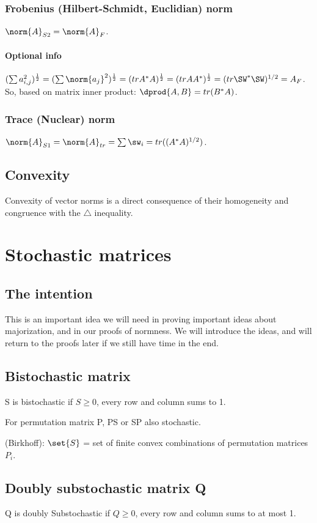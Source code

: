 \documentclass[10pt]{amsart}
\begin{document}
\subsubsection{Frobenius (Hilbert-Schmidt, Euclidian) norm}
$\norm{A}_{S2} = \norm{A}_{F}$.

\paragraph*{Optional info}
$(\sum a_{i,j}^{2})^{\frac{1}{2}} = (\sum \norm{a_{j}}^{2})^{\frac{1}{2}} = (tr A^{*}A)^{\frac{1}{2}} = (tr AA^{*})^{\frac{1}{2}} = (tr \SW^{*}\SW)^{1/2} = A_{F}$. So, based on matrix inner product: $\dprod{A,B} = tr(B^{*}A)$.

\subsubsection{Trace (Nuclear) norm}
$\norm{A}_{S1} = \norm{A}_{tr} = \sum \sw_{i} = tr((A^{*}A)^{1/2})$.

\subsection{Convexity}
Convexity of vector norms is a direct consequence of their homogeneity and congruence with the $\triangle$ inequality.

\section{Stochastic matrices}
\subsection{The intention}
This is an important idea we will need in proving important ideas about majorization, and in our proofs of normness. We will introduce the ideas, and will return to the proofs later if we still have time in the end.

\subsection{Bistochastic matrix}
S is bistochastic if $S\geq 0$, every row and column sums to 1.

For permutation matrix P, PS or SP also stochastic.

(Birkhoff): $\set{S}$ = set of finite convex combinations of permutation matrices $P_{i}$.

\subsection{Doubly substochastic matrix Q}
Q is doubly Substochastic if $Q \geq 0$, every row and column sums to at most 1.
\end{document}
